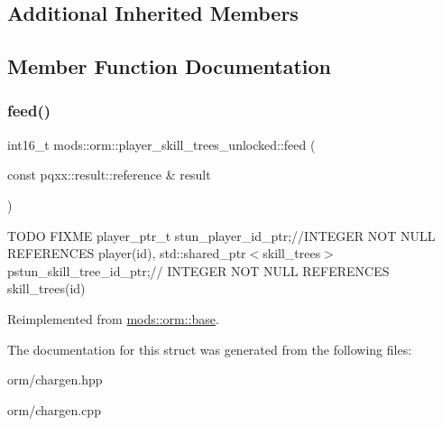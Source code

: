 \subsection*{Additional Inherited Members}


\subsection{Member Function Documentation}
\mbox{\label{structmods_1_1orm_1_1player__skill__trees__unlocked_a433aeb4a59fe50b22ffe07593cc70aa5}} 
\subsubsection{\texorpdfstring{feed()}{feed()}}
{\footnotesize\ttfamily int16\+\_\+t mods\+::orm\+::player\+\_\+skill\+\_\+trees\+\_\+unlocked\+::feed (\begin{DoxyParamCaption}\item[{const pqxx\+::result\+::reference \&}]{result }\end{DoxyParamCaption})\hspace{0.3cm}{\ttfamily [virtual]}}

T\+O\+DO F\+I\+X\+ME player\+\_\+ptr\+\_\+t stun\+\_\+player\+\_\+id\+\_\+ptr;//\+I\+N\+T\+E\+G\+ER N\+OT N\+U\+LL R\+E\+F\+E\+R\+E\+N\+C\+ES player(id), std\+::shared\+\_\+ptr$<$skill\+\_\+trees$>$ pstun\+\_\+skill\+\_\+tree\+\_\+id\+\_\+ptr;// I\+N\+T\+E\+G\+ER N\+OT N\+U\+LL R\+E\+F\+E\+R\+E\+N\+C\+ES skill\+\_\+trees(id)

Reimplemented from \hyperlink{structmods_1_1orm_1_1base}{mods\+::orm\+::base}.



The documentation for this struct was generated from the following files\+:\begin{DoxyCompactItemize}
\item 
orm/chargen.\+hpp\item 
orm/chargen.\+cpp\end{DoxyCompactItemize}
